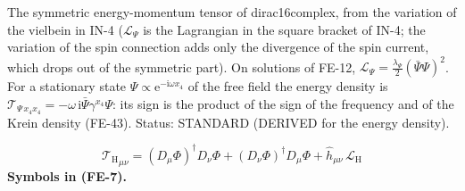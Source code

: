 \documentclass[
  10pt,
]{article}
\begin{document}
The symmetric energy-momentum tensor of dirac16complex, from the
variation of the vielbein in IN-4 (\(\mathcal{L}_\Psi\) is the
Lagrangian in the square bracket of IN-4; the variation of the spin
connection adds only the divergence of the spin current, which drops out
of the symmetric part). On solutions of FE-12,
\(\mathcal{L}_\Psi = \frac{\lambda_\Psi}{2}(\bar\Psi\Psi)^2\). For a
stationary state \(\Psi \propto \mathrm{e}^{-\mathrm{i}\omega x_4}\) of
the free field the energy density is
\(\mathcal{T}_{\Psi\,x_4x_4} = -\omega\,\mathrm{i}\bar\Psi\gamma^{x_4}\Psi\):
its sign is the product of the sign of the frequency and of the Krein
density (FE-43). Status: STANDARD (DERIVED for the energy density).

\[
{\mathcal{T}_{\mathrm{H}}}_{\mu\nu} = (D_\mu\Phi)^\dagger D_\nu\Phi + (D_\nu\Phi)^\dagger D_\mu\Phi + \hat h_{\mu\nu}\,\mathcal{L}_{\mathrm{H}} \tag{FE-7}
\] \textbf{Symbols in (FE-7).}
\end{document}
